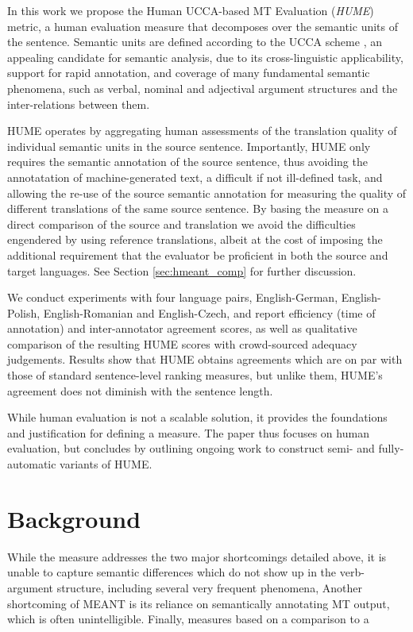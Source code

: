 \documentclass[11pt]{article}
\newcommand{\secref}[1]{Section \ref{#1}}
\begin{document}
In this work we propose the Human UCCA-based MT Evaluation ({\it HUME}) metric,
a human evaluation measure that decomposes over the semantic units of the sentence.
Semantic units are defined according to the 
UCCA scheme \cite{abend2013universal}, an appealing candidate for semantic analysis,
due to its cross-linguistic applicability, support for rapid annotation, and coverage
of many fundamental semantic phenomena, such as verbal, nominal and adjectival
argument structures and the inter-relations between them.

HUME operates by aggregating human assessments of the translation quality of individual
semantic units in the source sentence.
Importantly, HUME only requires the semantic annotation of the source sentence, thus avoiding the 
annotatation of machine-generated text, a difficult if not ill-defined task, and allowing the re-use
of the source semantic annotation for measuring the quality of different translations of the same source sentence.
By basing the measure on a direct comparison
of the source and translation we avoid the difficulties engendered by using
reference translations, albeit at the cost of imposing the additional requirement
that the evaluator be proficient in both the source and target languages.
See \secref{sec:hmeant_comp} for further discussion.

We conduct experiments with four language pairs, English-German, English-Polish,
English-Romanian and English-Czech, and report efficiency (time of annotation) and
inter-annotator agreement scores, as well as qualitative comparison of the resulting
HUME scores with crowd-sourced adequacy judgements. Results show that HUME obtains 
agreements which are on par with those of standard sentence-level ranking measures,
but unlike them, HUME's agreement does not diminish with the sentence length.

While human evaluation is not a scalable solution,
it provides the foundations and justification for defining a measure.
The paper thus focuses on human evaluation, but concludes
by outlining ongoing work to construct semi- and fully-automatic variants of HUME.


\section{Background}\label{sec:background}

While the measure addresses the two major shortcomings
detailed above, it is unable to capture semantic differences which do not show up in
the verb-argument structure, including several very frequent phenomena, 
Another shortcoming of MEANT is its reliance on semantically annotating MT output,
which is often unintelligible. Finally, measures based on a comparison to a
\end{document}
